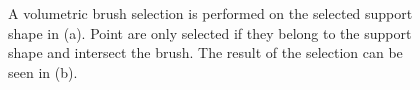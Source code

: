 \begin{figure}
\centering
{}
\caption[Example of an improved volumetric brush selection]
{A volumetric brush selection is performed on the selected support shape in (a). Point are only selected if they belong to the support shape and intersect the brush. The result of the selection can be seen in (b).}
\label{fig:technologiezentrum_brush}
\end{figure}


